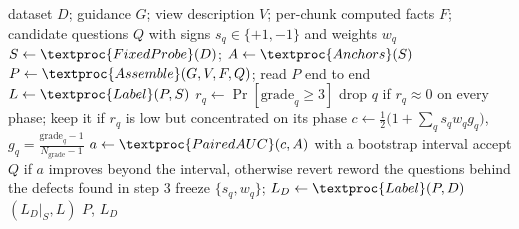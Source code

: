 %
\newcommand{\manual}{\textsc{[manual]}}
\begin{procedure}[t]
\caption{Pseudo-code of the question-set construction protocol. A single probe set is
fixed up front and reused by every revision, so two revisions differ only in wording.
Steps marked \manual{} are done by a person; the rest are scripted.}
\label{proc:prompt}
\begin{algorithmic}[1]
\Require dataset $D$; guidance $G$; view description $V$; per-chunk computed facts $F$;
  candidate questions $Q$ with signs $s_q\in\{+1,-1\}$ and weights $w_q$
\State $S \gets \textproc{FixedProbe}(D)$; \quad $A \gets \textproc{Anchors}(S)$
\Repeat
  \State $P \gets \textproc{Assemble}(G, V, F, Q)$; read $P$ end to end \Comment{\manual}
  \State $L \gets \textproc{Label}(P, S)$ 
    \State $r_q \gets \Pr[\text{grade}_q \ge 3]$ 
    \State drop $q$ if $r_q \approx 0$ on every phase; keep it if $r_q$ is low but concentrated on its phase
  \EndFor
  \State $c \gets \tfrac{1}{2}\bigl(1 + \sum_q s_q w_q g_q\bigr)$, \;
    $g_q = \tfrac{\text{grade}_q - 1}{N_{\text{grade}} - 1}$
  \State $a \gets \textproc{PairedAUC}(c, A)$ with a bootstrap interval
  \State accept $Q$ if $a$ improves beyond the interval, otherwise revert
  \State reword the questions behind the defects found in step 3 \Comment{\manual}
\State freeze $\{s_q, w_q\}$; \quad $L_D \gets \textproc{Label}(P, D)$ 
\State {}$(L_D|_S, L)$ 
\State \Return $P$, $L_D$
\end{algorithmic}
\end{procedure}
